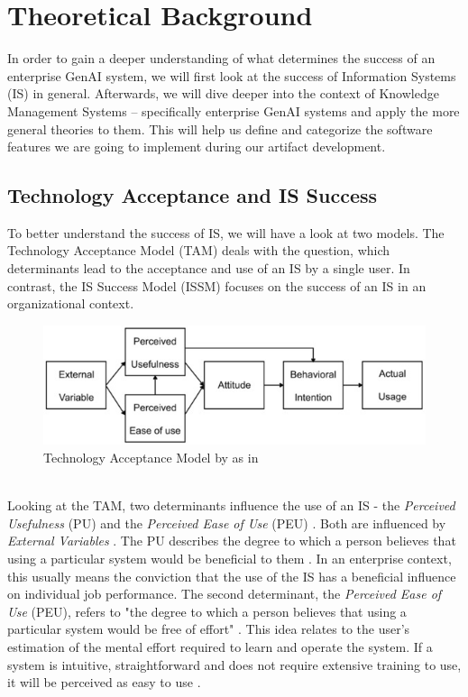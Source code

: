 \documentclass[
	english,
	ruledheaders=section,%
	class=report,%
	thesis={type=bachelor},%
	accentcolor=1b,%
	custommargins=true,%
	marginpar=false,%
	parskip=half-,%
	fontsize=11pt,%
	DIV=14,
]{tudapub}
\begin{document}
\chapter{Theoretical Background}
In order to gain a deeper understanding of what determines the success of an enterprise GenAI system, we will first look at the success of Information Systems (IS) in general. Afterwards, we will dive deeper into the context of Knowledge Management Systems -- specifically enterprise GenAI systems and apply the more general theories to them. This will help us define and categorize the software features we are going to implement during our artifact development.
\section{Technology Acceptance and IS Success}
To better understand the success of IS, we will have a look at two models. The Technology Acceptance Model (TAM) \parencite{Davis1989} deals with the question, which determinants lead to the acceptance and use of an IS by a single user. In contrast, the IS Success Model \parencite{DeloneMcLean2003ISSuccessTenYearUpdate} (ISSM) focuses on the success of an IS in an organizational context.
\begin{figure}[h!]
    \includegraphics[width=1\linewidth]{images/TAM.png}
    \caption{Technology Acceptance Model by \parencite{Davis1989} as in \parencite[p.~61]{Ma2004}}
    \label{fig:enter-label}
\end{figure}
\\
Looking at the TAM, two determinants influence the use of an IS - the \textit{Perceived Usefulness} (PU) and the \textit{Perceived Ease of Use} (PEU) \parencite[p.~320]{Davis1989}. Both are influenced by \textit{External Variables} \parencite[p.~335]{Davis1989}. The PU describes the degree to which a person believes that using a particular system would be beneficial to them \parencite[p.~320]{Davis1989}. In an enterprise context, this usually means the conviction that the use of the IS has a beneficial influence on individual job performance. The second determinant, the \textit{Perceived Ease of Use} (PEU), refers to "the degree to which a person believes that using a particular system would be free of effort" \parencite[p.~320]{Davis1989}. This idea relates to the user's estimation of the mental effort required to learn and operate the system. If a system is intuitive, straightforward and does not require extensive training to use, it will be perceived as easy to use \parencite[pp.~324-325]{Davis1989}.\\
\end{document}
